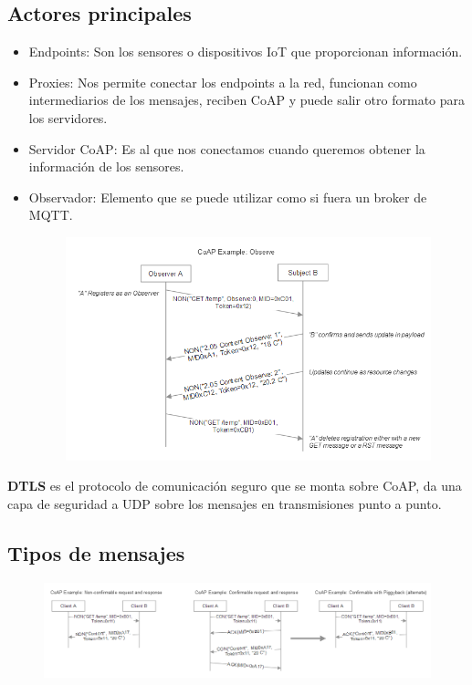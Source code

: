 \documentclass[12pt]{report} %
\begin{document}
\subsection{Actores principales}
\begin{itemize}
	\item Endpoints: Son los sensores o dispositivos IoT que proporcionan información.
	\item Proxies: Nos permite conectar los endpoints a la red, funcionan como intermediarios de los mensajes, reciben CoAP y puede salir otro formato para los servidores.
	\item Servidor CoAP: Es al que nos conectamos cuando queremos obtener la información de los sensores.
	\item Observador: Elemento que se puede utilizar como si fuera un broker de MQTT.
	\begin{figure}[H]
		{\includegraphics[scale=.48]{2a2f42a1-0813-4e84-a244-72e6f2667ba8.png}}
	\end{figure}

	
\end{itemize}

\textbf{DTLS} es el protocolo de comunicación seguro que se monta sobre CoAP, da una capa de seguridad a UDP sobre los mensajes en transmisiones punto a punto.

\subsection{Tipos de mensajes}
\begin{figure}[H]
	{\includegraphics[scale=.48]{d5c42d4c-400c-4d55-9eea-96fc5bedf353.png}}
\end{figure}
\end{document}
